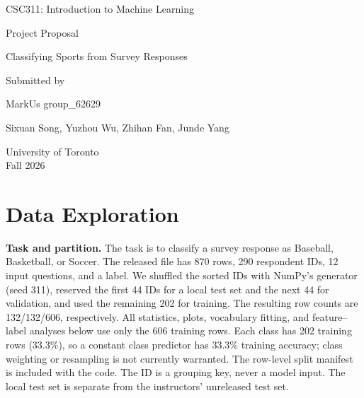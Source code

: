 \documentclass[12pt]{article}
\begin{document}
\begin{titlepage}
\centering
\vspace*{2.5cm}
{\Large CSC311: Introduction to Machine Learning\par}
\vspace{1cm}
{\LARGE Project Proposal\par}
\vspace{.6cm}
{\large Classifying Sports from Survey Responses\par}
\vspace{2cm}
{\large Submitted by\par}
\vspace{.5cm}
{\large MarkUs group\_62629\par}
\vspace{.5cm}
{\large Sixuan Song, Yuzhou Wu, Zhihan Fan, Junde Yang\par}
\vfill
{\large University of Toronto\\Fall 2026\par}
\end{titlepage}
\setcounter{page}{1}

\section{Data Exploration}
\textbf{Task and partition.}
The task is to classify a survey response as Baseball, Basketball, or Soccer. The
released file has 870 rows, 290 respondent IDs, 12 input questions, and a label.
We shuffled the sorted IDs with NumPy's generator (seed 311), reserved the first
44 IDs for a local test set and the next 44 for validation, and used the remaining
202 for training. The resulting row counts are 132/132/606, respectively.
All statistics, plots, vocabulary fitting, and feature--label analyses below use
only the 606 training rows. Each class has 202 training rows (33.3\%), so a constant
class predictor has 33.3\% training accuracy; class weighting or resampling is not
currently warranted. The row-level split manifest is included with the code.
The ID is a grouping key, never a model input. The local test set is separate
from the instructors' unreleased test set.
\end{document}
